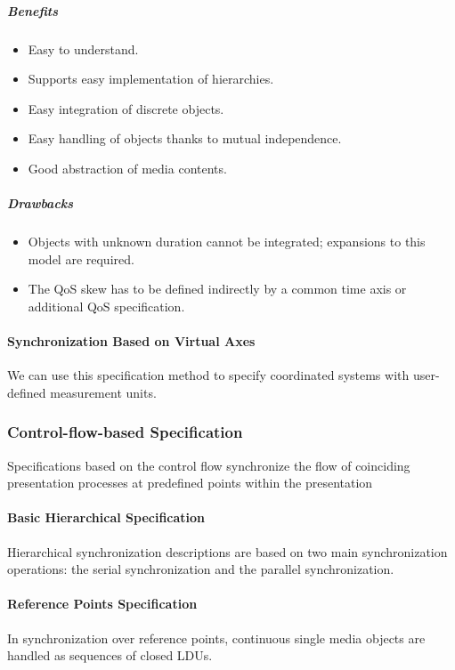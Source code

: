 \subparagraph*{Benefits}
\begin{multicols}{2}
	\begin{itemize}
		\item Easy to understand.
		\item Supports easy implementation of hierarchies.
		\item Easy integration of discrete objects.
		\item Easy handling of objects thanks to mutual independence.
		\item Good abstraction of media contents.
	\end{itemize}
\end{multicols}



\subparagraph*{Drawbacks}

\begin{multicols}{2}
	\begin{itemize}
		\item Objects with unknown duration cannot be integrated; expansions to this model are required.
		\item The QoS skew has to be defined indirectly by a common time axis or additional QoS specification.
	\end{itemize}
\end{multicols}

\paragraph*{Synchronization Based on Virtual Axes}
We can use this specification method to specify coordinated systems with user-defined measurement units.

\subsubsection{Control-flow-based Specification}
Specifications based on the control flow synchronize the flow of coinciding presentation processes at predefined points within the presentation

\paragraph*{Basic Hierarchical Specification}
Hierarchical synchronization descriptions are based on two main synchronization operations: the serial synchronization and the parallel synchronization.


\paragraph*{Reference Points Specification}
In synchronization over reference points, continuous single media objects are handled as sequences of closed LDUs.

